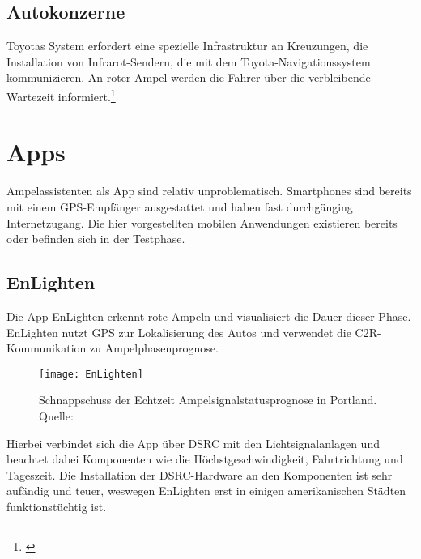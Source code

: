 \subsection{Autokonzerne}
Toyotas System erfordert eine spezielle Infrastruktur an Kreuzungen, die Installation von Infrarot-Sendern, die mit dem Toyota-Navigationssystem kommunizieren. An roter Ampel werden die Fahrer über die verbleibende Wartezeit informiert.\footnote{\cite{Toyota}}\\
%
%
\section{Apps}
Ampelassistenten als App sind relativ unproblematisch. Smartphones sind bereits mit einem \gls{GPS}-Empfänger ausgestattet und haben fast durchgänging Internetzugang. Die hier vorgestellten mobilen Anwendungen existieren bereits oder befinden sich in der Testphase.
\subsection{EnLighten}
Die \gls{App} EnLighten erkennt rote Ampeln und visualisiert die Dauer dieser Phase. EnLighten nutzt \gls{GPS} zur Lokalisierung des Autos und verwendet die \gls{C2R}-Kommunikation zu Ampelphasenprognose.
\begin{figure}[H]
    \centering
    \texttt{[image: EnLighten]}
    \label{fig:Ampelsignalstatus}
    \caption[Echtzeit Ampelsignalstatus]{Schnappschuss der Echtzeit Ampelsignalstatusprognose in Portland. Quelle: \cite{EnLighten}}
\end{figure}
Hierbei verbindet sich die App über \gls{DSRC} mit den Lichtsignalanlagen und beachtet dabei Komponenten wie die Höchstgeschwindigkeit, Fahrtrichtung und Tageszeit. Die Installation der \gls{DSRC}-Hardware an den Komponenten ist sehr aufändig und teuer, weswegen EnLighten erst in einigen amerikanischen Städten funktionstüchtig ist.

